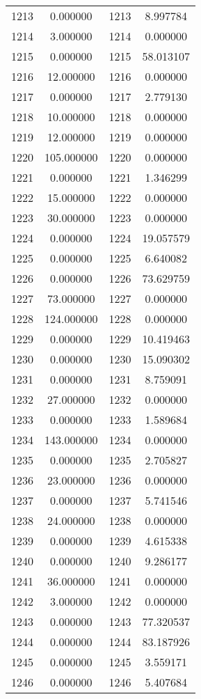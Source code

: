\documentclass[12pt]{article}
\begin{document}
\begin{longtable}{@{}cccc@{}}
1213 & 0.000000 & 1213 & 8.997784 \\
1214 & 3.000000 & 1214 & 0.000000 \\
1215 & 0.000000 & 1215 & 58.013107 \\
1216 & 12.000000 & 1216 & 0.000000 \\
1217 & 0.000000 & 1217 & 2.779130 \\
1218 & 10.000000 & 1218 & 0.000000 \\
1219 & 12.000000 & 1219 & 0.000000 \\
1220 & 105.000000 & 1220 & 0.000000 \\
1221 & 0.000000 & 1221 & 1.346299 \\
1222 & 15.000000 & 1222 & 0.000000 \\
1223 & 30.000000 & 1223 & 0.000000 \\
1224 & 0.000000 & 1224 & 19.057579 \\
1225 & 0.000000 & 1225 & 6.640082 \\
1226 & 0.000000 & 1226 & 73.629759 \\
1227 & 73.000000 & 1227 & 0.000000 \\
1228 & 124.000000 & 1228 & 0.000000 \\
1229 & 0.000000 & 1229 & 10.419463 \\
1230 & 0.000000 & 1230 & 15.090302 \\
1231 & 0.000000 & 1231 & 8.759091 \\
1232 & 27.000000 & 1232 & 0.000000 \\
1233 & 0.000000 & 1233 & 1.589684 \\
1234 & 143.000000 & 1234 & 0.000000 \\
1235 & 0.000000 & 1235 & 2.705827 \\
1236 & 23.000000 & 1236 & 0.000000 \\
1237 & 0.000000 & 1237 & 5.741546 \\
1238 & 24.000000 & 1238 & 0.000000 \\
1239 & 0.000000 & 1239 & 4.615338 \\
1240 & 0.000000 & 1240 & 9.286177 \\
1241 & 36.000000 & 1241 & 0.000000 \\
1242 & 3.000000 & 1242 & 0.000000 \\
1243 & 0.000000 & 1243 & 77.320537 \\
1244 & 0.000000 & 1244 & 83.187926 \\
1245 & 0.000000 & 1245 & 3.559171 \\
1246 & 0.000000 & 1246 & 5.407684 \\

\end{longtable}
\end{document}
